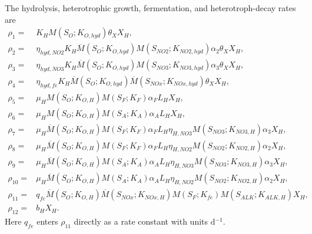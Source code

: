 \documentclass[a4paper,fleqn]{cas-sc}
\begin{document}
The hydrolysis, heterotrophic growth, fermentation, and heterotroph-decay rates are
\begin{align}
\rho_1={}&K_HM(S_O;K_{O,hyd})\theta_XX_H,\\
\rho_2={}&\eta_{hyd,NO2}K_H\overline M(S_O;K_{O,hyd})M(S_{NO2};K_{NO2,hyd})\alpha_2\theta_XX_H,\\
\rho_3={}&\eta_{hyd,NO3}K_H\overline M(S_O;K_{O,hyd})M(S_{NO3};K_{NO3,hyd})\alpha_3\theta_XX_H,\\
\rho_4={}&\eta_{hyd,fe}K_H\overline M(S_O;K_{O,hyd})\overline M(S_{NOx};K_{NOx,hyd})\theta_XX_H,\\
\rho_5={}&\mu_HM(S_O;K_{O,H})M(S_F;K_F)\alpha_FL_HX_H,\\
\rho_6={}&\mu_HM(S_O;K_{O,H})M(S_A;K_A)\alpha_AL_HX_H,\\
\rho_7={}&\mu_H\overline M(S_O;K_{O,H})M(S_F;K_F)\alpha_FL_H\eta_{H,NO3}M(S_{NO3};K_{NO3,H})\alpha_3X_H,\\
\rho_8={}&\mu_H\overline M(S_O;K_{O,H})M(S_F;K_F)\alpha_FL_H\eta_{H,NO2}M(S_{NO2};K_{NO2,H})\alpha_2X_H,\\
\rho_9={}&\mu_H\overline M(S_O;K_{O,H})M(S_A;K_A)\alpha_AL_H\eta_{H,NO3}M(S_{NO3};K_{NO3,H})\alpha_3X_H,\\
\rho_{10}={}&\mu_H\overline M(S_O;K_{O,H})M(S_A;K_A)\alpha_AL_H\eta_{H,NO2}M(S_{NO2};K_{NO2,H})\alpha_2X_H,\\
\rho_{11}={}&q_{fe}\overline M(S_O;K_{O,H})\overline M(S_{NOx};K_{NOx,H})M(S_F;K_{fe})M(S_{ALK};K_{ALK,H})X_H,\\
\rho_{12}={}&b_HX_H.
\end{align}
Here $q_{fe}$ enters $\rho_{11}$ directly as a rate constant with units d$^{-1}$.
\end{document}
